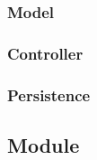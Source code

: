 \documentclass[enabledeprecatedfontcommands,fontsize=12pt,paper=a4,twoside]{scrartcl}
\begin{document}
\subsubsection{Model}

\subsubsection{Controller}

\subsubsection{Persistence}

\subsection{Module}
\end{document}
